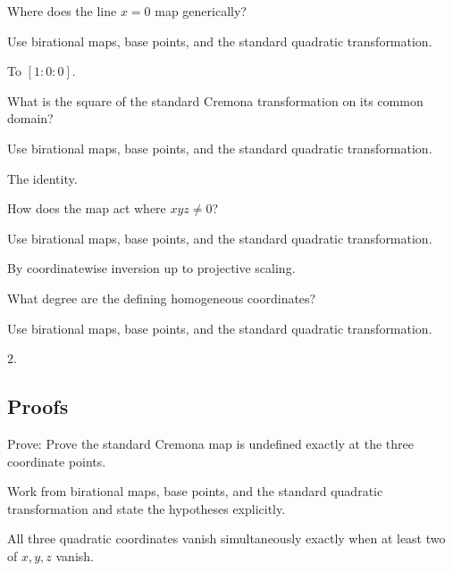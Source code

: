 \begin{exercise}\label{exr:vi44-expand-02}
Where does the line $x=0$ map generically?
\end{exercise}
\begin{hint}
Use birational maps, base points, and the standard quadratic transformation.
\end{hint}
\begin{solution}
To $[1:0:0]$.
\end{solution}

\begin{exercise}[Involution]\label{exr:vi44-expand-03}
What is the square of the standard Cremona transformation on its common domain?
\end{exercise}
\begin{hint}
Use birational maps, base points, and the standard quadratic transformation.
\end{hint}
\begin{solution}
The identity.
\end{solution}

\begin{exercise}\label{exr:vi44-expand-04}
How does the map act where $xyz\ne0$?
\end{exercise}
\begin{hint}
Use birational maps, base points, and the standard quadratic transformation.
\end{hint}
\begin{solution}
By coordinatewise inversion up to projective scaling.
\end{solution}

\begin{exercise}[Degree]\label{exr:vi44-expand-05}
What degree are the defining homogeneous coordinates?
\end{exercise}
\begin{hint}
Use birational maps, base points, and the standard quadratic transformation.
\end{hint}
\begin{solution}
$2$.
\end{solution}

\subsection*{Proofs}

\begin{exercise}\label{exr:vi44-expand-06}
Prove: Prove the standard Cremona map is undefined exactly at the three coordinate points.
\end{exercise}
\begin{hint}
Work from birational maps, base points, and the standard quadratic transformation and state the hypotheses explicitly.
\end{hint}
\begin{solution}
All three quadratic coordinates vanish simultaneously exactly when at least two of $x,y,z$ vanish.
\end{solution}

